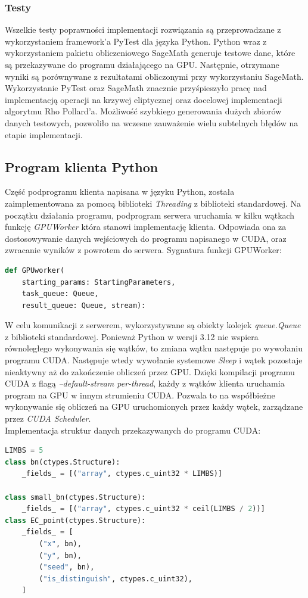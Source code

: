 \subsubsection{Testy}
Wszelkie testy poprawności implementacji rozwiązania są przeprowadzane z wykorzystaniem framework'a PyTest dla języka Python.
Python wraz z wykorzystaniem pakietu obliczeniowego SageMath generuje testowe dane, które
są przekazywane do programu działającego na GPU. Następnie, otrzymane wyniki są porównywane z rezultatami
obliczonymi przy wykorzystaniu SageMath. Wykorzystanie PyTest oraz SageMath znacznie przyśpieszyło pracę
nad implementacją operacji na krzywej eliptycznej oraz docelowej implementacji algorytmu Rho Pollard'a.
Możliwość szybkiego generowania dużych zbiorów danych testowych, pozwoliło na wczesne zauważenie wielu subtelnych błędów
na etapie implementacji.


\subsection{Program klienta Python}
Część podprogramu klienta napisana w języku Python, została zaimplementowana
za pomocą biblioteki \textit{Threading} z biblioteki standardowej.
Na początku działania programu, podprogram serwera uruchamia w kilku wątkach
funkcję \textit{GPUWorker} która stanowi implementację klienta.
Odpowiada ona za
dostosowywanie danych wejściowych do programu napisanego w CUDA, oraz
zwracanie wyników z powrotem do serwera. Sygnatura funkcji GPUWorker:

\begin{lstlisting}[language=Python]
def GPUworker(
    starting_params: StartingParameters,
    task_queue: Queue,
    result_queue: Queue, stream):
\end{lstlisting}

W celu komunikacji z serwerem, wykorzystywane są obiekty kolejek
\textit{queue.Queue} z biblioteki standardowej.
Ponieważ Python w wersji 3.12 nie wspiera równoległego wykonywania
się wątków, to zmiana wątku następuje po wywołaniu programu CUDA.
Następuje wtedy wywołanie systemowe \textit{Sleep} i wątek pozostaje nieaktywny
aż do zakończenie obliczeń przez GPU.
Dzięki kompilacji programu CUDA z flagą \textit{--default-stream per-thread},
każdy z wątków klienta uruchamia program na GPU w innym strumieniu CUDA. Pozwala
to na współbieżne wykonywanie się obliczeń na GPU uruchomionych przez każdy wątek, zarządzane przez
\textit{CUDA Scheduler}. \\
Implementacja struktur danych przekazywanych do programu CUDA:
\begin{lstlisting}[language=Python]
LIMBS = 5
class bn(ctypes.Structure):
    _fields_ = [("array", ctypes.c_uint32 * LIMBS)]

class small_bn(ctypes.Structure):
    _fields_ = [("array", ctypes.c_uint32 * ceil(LIMBS / 2))]
class EC_point(ctypes.Structure):
    _fields_ = [
        ("x", bn),
        ("y", bn),
        ("seed", bn),
        ("is_distinguish", ctypes.c_uint32),
    ]
\end{lstlisting}

